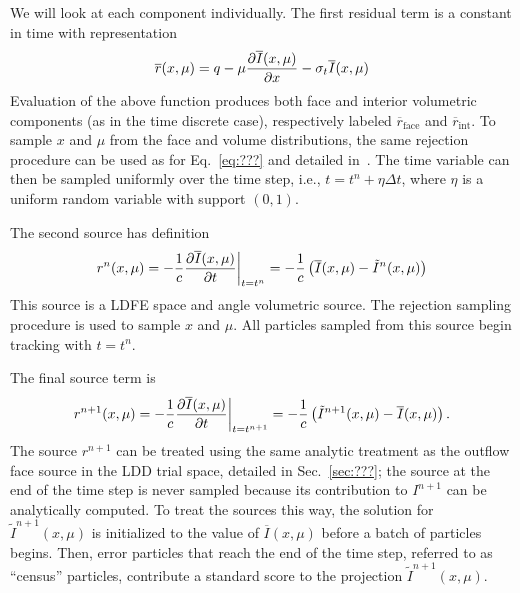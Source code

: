 We will look at each component individually.  
The first residual term is a constant in time with representation
\begin{equation}
    \overline r(x,\mu) = q  - \mu \frac{\partial \overline I(x,\mu)}{\partial x} - \sigma_t \overline
    I(x,\mu)
\end{equation}
Evaluation of the above function produces both face and interior volumetric components (as
in the time discrete case), respectively labeled $\overline r_{\text{face}}$ and
$\overline{r}_{\text{int}}$.  To sample $x$ and $\mu$ from the face and volume distributions, the
same rejection procedure can be used as for Eq.~\eqref{eq:???} and detailed
in~\cite{jake}.    The time variable can then be sampled uniformly over the time step,
i.e., $t=t^n + \eta \Delta t$, where $\eta$ is a uniform random variable with support
$(0,1)$.

The second source has definition
\begin{equation}
    r^{n}(x,\mu) = -\frac{1}{c}\frac{\partial \overline{I}(x,\mu)}{\partial t}\bigg|_{t=t^{n}}
    =-\frac{1}{c}\left(\overline I(x,\mu) - \tilde I^{n}(x,\mu)\right)
\end{equation}
This source is a LDFE space and angle volumetric source.
The rejection sampling procedure is used to sample $x$ and $\mu$.
All particles sampled from this source begin tracking with $t=t^{n}$.

The final source term is
\begin{equation}
    r^{n+1}(x,\mu) = -\frac{1}{c}\frac{\partial \overline{I}(x,\mu)}{\partial t}\bigg|_{t=t^{n+1}}
    =-\frac{1}{c}\left(\tilde I^{n+1}(x,\mu) - \overline I(x,\mu)\right).
\end{equation}
The source $r^{n+1}$ can be treated using the
same analytic treatment as the outflow face source in the LDD
trial space, detailed in Sec.~\ref{sec:???}; the source at the end of the time step is never sampled because its
contribution to $I^{n+1}$ can be analytically computed.  To treat the sources this way, the solution for $\tilde I^{n+1}(x,\mu)$ is
initialized to the value of $\overline I(x,\mu)$ before a batch of particles begins.
Then, error particles that reach the end of the time step, referred to as ``census''
particles, contribute a standard score to the projection $\tilde I^{n+1}(x,\mu)$.


